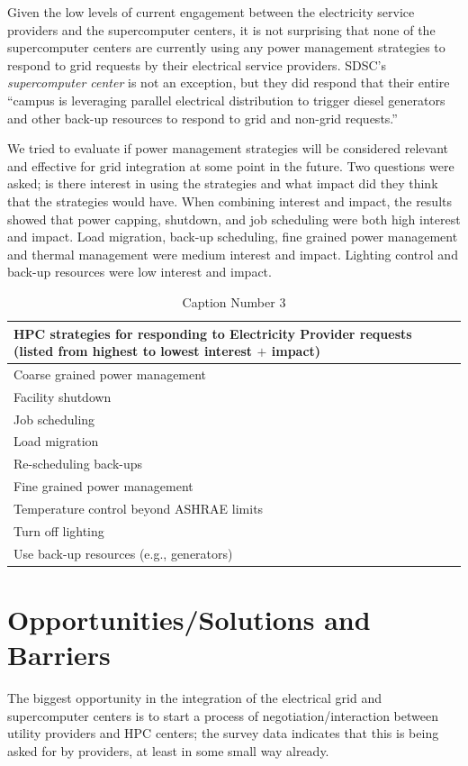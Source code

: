 \documentclass{llncs}
\begin{document}
Given the low levels of current engagement between the electricity service
providers and the supercomputer centers, it is not surprising that none of
the supercomputer centers are currently using any power management
strategies to respond to grid requests by their electrical service
providers. SDSC's \textit{supercomputer center} is not an exception, but they did respond that their
entire ``campus is leveraging parallel electrical distribution to trigger
diesel generators and other back-up resources to respond to grid and
non-grid requests.''

We tried to evaluate if power management strategies will be considered
relevant and effective for grid integration at some point in the future. Two
questions were asked; is there interest in using the strategies and what
impact did they think that the strategies would have. When combining
interest and impact, the results showed that power capping, shutdown, and
job scheduling were both high interest and impact. Load migration, back-up
scheduling, fine grained power management and thermal management were medium
interest and impact. Lighting control and back-up resources were low
interest and impact.


\begin{table}[htbp]

\begin{center}
\caption{Caption Number 3}
\begin{tabular}{|p{299pt}|}
\hline
\textbf{HPC strategies for responding to Electricity Provider requests (listed from highest to lowest interest }$+$\textbf{ impact)} \\
\hline
Coarse grained power management \\
\hline
Facility shutdown \\
\hline
Job scheduling \\
\hline
Load migration \\
\hline
Re-scheduling back-ups \\
\hline
Fine grained power management \\
\hline
Temperature control beyond ASHRAE limits \\
\hline
Turn off lighting \\
\hline
Use back-up resources (e.g., generators) \\
\hline
\end{tabular}
\label{tab3}
\end{center}
\end{table}

\section{Opportunities/Solutions and Barriers}
The biggest opportunity in the integration of the electrical grid and supercomputer centers is to start a process of negotiation/interaction between utility providers and HPC centers; the survey data indicates that this is being asked for by providers, at least in some small way already.
\end{document}
